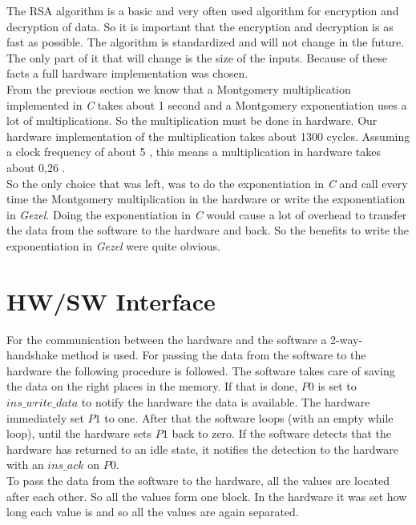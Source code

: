 \documentclass[a4paper]{article}
\begin{document}
The RSA algorithm is a basic and very often used algorithm for encryption and decryption of data. So it is important that the encryption and decryption is as fast as possible. The algorithm is standardized and will not change in the future. The only part of it that will change is the size of the inputs. Because of these facts a full hardware implementation was chosen.\\

From the previous section we know that a Montgomery multiplication implemented in \textit{C} takes about 1 second and a Montgomery exponentiation uses a lot of multiplications. So the multiplication must be done in hardware. Our hardware implementation of the multiplication takes about 1300 cycles. Assuming a clock frequency of about 5 \mega \hertz, this means a multiplication in hardware takes about 0,26 \micro \second.\\

So the only choice that was left, was to do the exponentiation in \textit{C} and call every time the Montgomery multiplication in the hardware or write the exponentiation in \textit{Gezel}. Doing the exponentiation in \textit{C} would cause a lot of overhead to transfer the data from the software to the hardware and back. So the benefits to write the exponentiation in \textit{Gezel} were quite obvious.

\section{HW/SW Interface}

For the communication between the hardware and the software a 2-way-handshake method is used. For passing the data from the software to the hardware the following procedure is followed. The software takes care of saving the data on the right places in the memory. If that is done, $P0$ is set to $ins\_write\_data$ to notify the hardware the data is available. The hardware immediately set $P1$ to one. After that the software loops (with an empty while loop), until the hardware sets $P1$ back to zero. If the software detects that the hardware has returned to an idle state, it notifies the detection to the hardware with an $ins\_ack$ on $P0$.\\

To pass the data from the software to the hardware, all the values are located after each other. So all the values form one block. In the hardware it was set how long each value is and so all the values are again separated.
\end{document}

